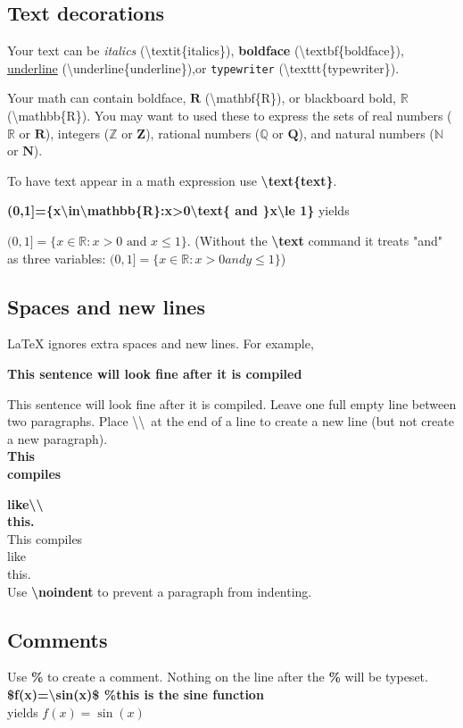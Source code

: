 \documentclass{article}
\begin{document}
\subsection{Text decorations}
Your text can be \textit{italics} (\textbackslash textit\{italics\}), \textbf{boldface} (\textbackslash textbf\{boldface\}), \underline{underline} (\textbackslash underline\{underline\}),or \texttt{typewriter} (\textbackslash texttt\{typewriter\}).

Your math can contain boldface, $\mathbf{R}$ (\textbackslash mathbf\{R\}), or blackboard bold, $\mathbb{R}$ (\textbackslash mathbb\{R\}).
You may want to used these to express the sets of real numbers ($\mathbb{R}$ or $\mathbf{R}$), integers ($\mathbb{Z}$ or $\mathbf{Z}$), rational numbers ($\mathbb{Q}$ or $\mathbf{Q}$), and natural numbers ($\mathbb{N}$ or $\mathbf{N}$).

To have text appear in a math expression use \textbf{\textbackslash text\{text\}}.

\textbf{(0,1]=\{x\textbackslash in\textbackslash mathbb\{R\}:x\textgreater0\textbackslash text\{ and \}x\textbackslash le 1\}} yields

$(0,1]=\{x\in\mathbb{R}:x>0\text{ and }x\le 1\}$. 
(Without the \textbf{\textbackslash text} command it treats "and" as three variables: $(0,1]=\{x\in\mathbb{R}:x>0 and y\le 1\}$) 

\subsection{Spaces and new lines}
{\LaTeX} ignores extra spaces and new lines. For example,

\textbf{This    sentence will        look
fine after      it is      compiled}

This sentence will look fine after it is compiled.
Leave one full empty line between two paragraphs.
Place \textbackslash\textbackslash\ at the end of a line to create a new line (but not create a new paragraph).\\
\textbf{This\\compiles}

\textbf{like\textbackslash\textbackslash\\this.}\\This compiles\\like\\this.\\
Use \textbf{\textbackslash noindent} to prevent a paragraph from indenting.

\subsection{Comments}
Use \textbf{\%} to create a comment.
Nothing on the line after the \textbf{\%} will be typeset.
\textbf{\$f(x)=\textbackslash sin(x)\$ \%this is the sine function}\\yields
$f(x)=\sin(x)$
\end{document}
